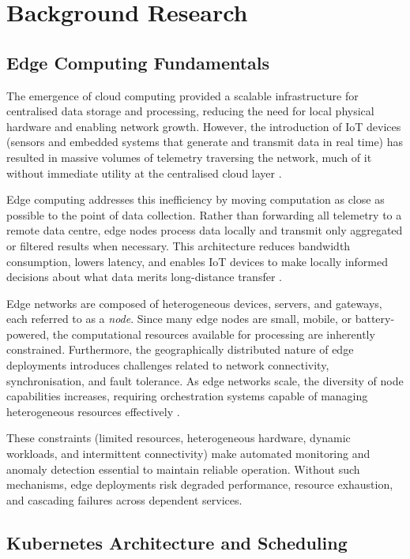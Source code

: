 \section{Background Research}

\subsection{Edge Computing Fundamentals}

The emergence of cloud computing provided a scalable infrastructure for centralised data storage and processing, reducing the need for local physical hardware and enabling network growth. However, the introduction of IoT devices (sensors and embedded systems that generate and transmit data in real time) has resulted in massive volumes of telemetry traversing the network, much of it without immediate utility at the centralised cloud layer \cite{kim2025exploring}.

Edge computing addresses this inefficiency by moving computation as close as possible to the point of data collection. Rather than forwarding all telemetry to a remote data centre, edge nodes process data locally and transmit only aggregated or filtered results when necessary. This architecture reduces bandwidth consumption, lowers latency, and enables IoT devices to make locally informed decisions about what data merits long-distance transfer \cite{shen2025codesign}.

Edge networks are composed of heterogeneous devices, servers, and gateways, each referred to as a \textit{node}. Since many edge nodes are small, mobile, or battery-powered, the computational resources available for processing are inherently constrained. Furthermore, the geographically distributed nature of edge deployments introduces challenges related to network connectivity, synchronisation, and fault tolerance. As edge networks scale, the diversity of node capabilities increases, requiring orchestration systems capable of managing heterogeneous resources effectively \cite{rasouli2025false}.

These constraints (limited resources, heterogeneous hardware, dynamic workloads, and intermittent connectivity) make automated monitoring and anomaly detection essential to maintain reliable operation. Without such mechanisms, edge deployments risk degraded performance, resource exhaustion, and cascading failures across dependent services.


\subsection{Kubernetes Architecture and Scheduling}

